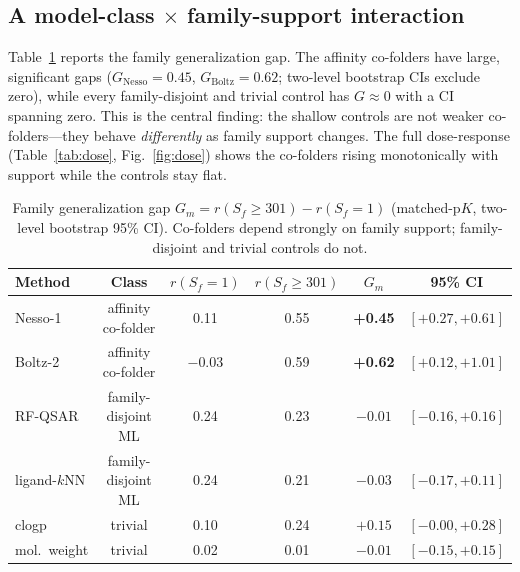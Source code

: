 \documentclass[11pt]{article}
\begin{document}
\subsection{A model-class $\times$ family-support interaction}
\label{sec:interaction}

Table~\ref{tab:gap} reports the family generalization gap. The affinity co-folders have large,
significant gaps ($G_{\text{Nesso}}=0.45$, $G_{\text{Boltz}}=0.62$; two-level bootstrap CIs exclude
zero), while every family-disjoint and trivial control has $G \approx 0$ with a CI spanning zero.
This is the central finding: the shallow controls are not weaker co-folders---they behave
\emph{differently} as family support changes. The full dose-response (Table~\ref{tab:dose},
Fig.~\ref{fig:dose}) shows the co-folders rising monotonically with support while the controls
stay flat.

\begin{table}[t]
\centering\small
\caption{Family generalization gap $G_m = r(S_f{\ge}301)-r(S_f{=}1)$ (matched-$\mathrm{p}K$,
two-level bootstrap 95\% CI). Co-folders depend strongly on family support; family-disjoint and
trivial controls do not.}
\label{tab:gap}
\begin{tabular}{lccccc}
\toprule
Method & Class & $r(S_f{=}1)$ & $r(S_f{\ge}301)$ & $G_m$ & 95\% CI \\
\midrule
Nesso-1      & affinity co-folder   & 0.11  & 0.55 & \textbf{+0.45} & $[+0.27,+0.61]$ \\
Boltz-2      & affinity co-folder   & $-0.03$ & 0.59 & \textbf{+0.62} & $[+0.12,+1.01]$ \\
RF-QSAR      & family-disjoint ML   & 0.24  & 0.23 & $-0.01$ & $[-0.16,+0.16]$ \\
ligand-$k$NN & family-disjoint ML   & 0.24  & 0.21 & $-0.03$ & $[-0.17,+0.11]$ \\
clogp        & trivial              & 0.10  & 0.24 & $+0.15$ & $[-0.00,+0.28]$ \\
mol.\ weight & trivial              & 0.02  & 0.01 & $-0.01$ & $[-0.15,+0.15]$ \\
\bottomrule
\end{tabular}
\end{table}
\end{document}
